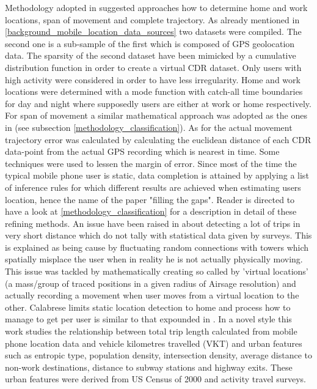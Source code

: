 \documentclass[12pt, a4paper]{report}
\theoremstyle{definition}
\theoremstyle{definition}%
\theoremstyle{definition}%
\theoremstyle{definition}%
\theoremstyle{definition}%
\theoremstyle{definition}%
\begin{document}
Methodology adopted in \cite{Hoteit2016} suggested approaches how to determine home and work locations, span of movement and complete trajectory. As already mentioned in \ref{background_mobile_location_data_sources} two datasets were compiled. The second one is a sub-sample of the first which is composed of GPS geolocation data. The sparsity of the second dataset have been mimicked by a cumulative distribution function in order to create a virtual CDR dataset. Only users with high activity were considered in order to have less irregularity. Home and work locations were determined with a mode function with catch-all time boundaries for day and night where supposedly users are either at work or home respectively. For span of movement a similar mathematical approach was adopted as the ones in \cite{Hoteit2014,Gonzalez2008} (see subsection  \ref{methodology_classification}). As for the actual movement trajectory error was calculated by calculating the euclidean distance of each CDR data-point from the actual GPS recording which is nearest in time.
Some techniques were used to lessen the margin of error. Since most of the time the typical mobile phone user is static, data completion is attained by applying a list of inference rules for which different results are achieved when estimating users location, hence the name of the paper "filling the gaps". Reader is directed to have a look at \ref{methodology_classification} for a description in detail of these refining methods. 
An issue have been raised in \cite{Calabrese2013} about detecting a lot of trips in very short distance which do not tally with statistical data given by surveys. This is explained as being cause by fluctuating random connections with towers which spatially misplace the user when in reality he is not actually physically moving. This issue was tackled by mathematically creating so called by \cite{Calabrese2013} 'virtual locations' (a mass/group of traced positions in a given radius of Airsage resolution) and actually recording a movement when user moves from a virtual location to the other. Calabrese limits static location detection to home and process how to manage to get per user is similar to that expounded in \cite{Hoteit2016}. In a novel style this work studies the relationship between total trip length calculated from mobile phone location data and vehicle kilometres travelled (VKT) and urban features such as entropic type, population density, intersection density, average distance to non-work destinations, distance to subway stations and highway exits. These urban features were derived from US Census of 2000 and activity travel surveys.
\end{document}
